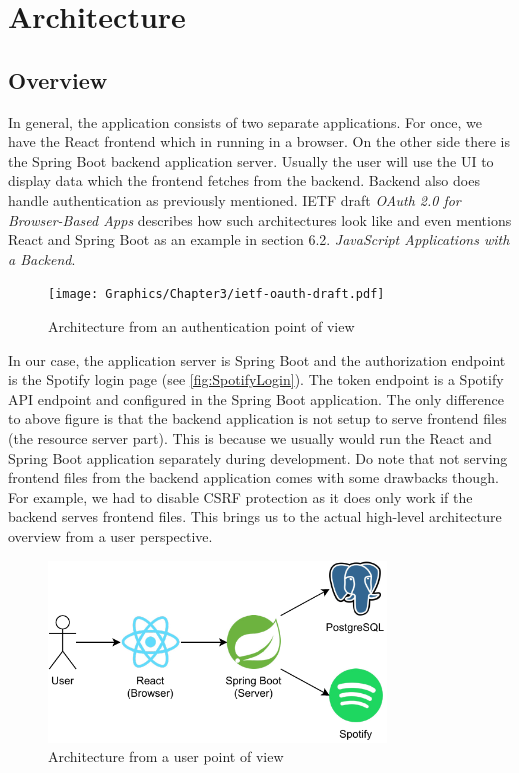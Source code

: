 \chapter{Architecture}
\label{ch:Architecture}

\section{Overview}

In general, the application consists of two separate applications. For once, we have the React frontend which in running in a browser. On the other side there is the Spring Boot backend application server. Usually the user will use the \ac{UI} to display data which the frontend fetches from the backend. Backend also does handle authentication as previously mentioned. \ac{IETF} draft \textit{OAuth 2.0 for Browser-Based Apps} describes how such architectures look like and even mentions React and Spring Boot as an example in section 6.2. \textit{JavaScript Applications with a Backend}.

\begin{figure}[bth]
    \centering
    \texttt{[image: Graphics/Chapter3/ietf-oauth-draft.pdf]}
    \caption{Architecture from an authentication point of view \cite[Section~6.2]{IetfOauthDraft}}
\end{figure}

In our case, the application server is Spring Boot and the authorization endpoint is the Spotify login page (see \autoref{fig:SpotifyLogin}). The token endpoint is a Spotify API endpoint and configured in the Spring Boot application. The only difference to above figure is that the backend application is not setup to serve frontend files (the resource server part). This is because we usually would run the React and Spring Boot application separately during development. Do note that not serving frontend files from the backend application comes with some drawbacks though. For example, we had to disable \ac{CSRF} protection as it does only work if the backend serves frontend files. This brings us to the actual high-level architecture overview from a user perspective.

\begin{figure}[bth]
    \centering
    \includegraphics[width=0.8\textwidth]{Graphics/Chapter3/architecture-overview.pdf}
    \caption{Architecture from a user point of view}
\end{figure}


